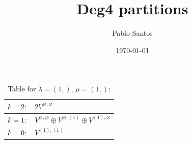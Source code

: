 \documentclass[a4paper,12pt]{article}
\title{Deg4 partitions}
\author{Pablo Santos}
\date{\today}
\begin{document}
\renewcommand{\arraystretch}{1.6} 
\begin{table}[H]
\centering
\caption{Table for $\lambda = (1,)$, $\mu = (1,)$:}
\begin{tabular}{|>{\centering\arraybackslash}p{15cm}|}
\hline
 $k = 2: \quad 2 V^{\varnothing, \varnothing} $ \\ \hline
 $k = 1: \quad V^{\varnothing, \varnothing} \oplus V^{\varnothing, (1)} \oplus V^{(1), \varnothing} $ \\ \hline
 $k = 0: \quad V^{(1), (1)} $ \\ \hline
\end{tabular}
\end{table}

\end{document}
